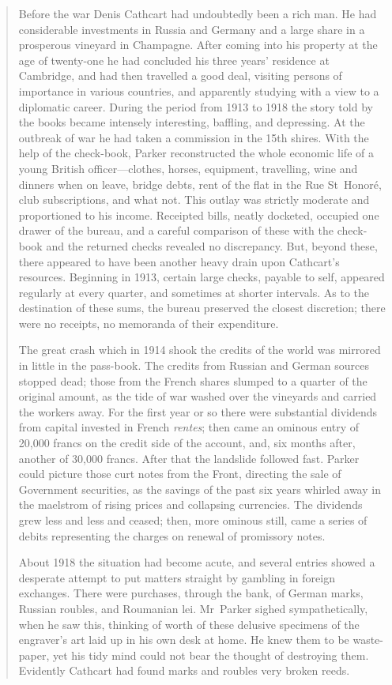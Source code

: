 \begin{quotation}
Before the war Denis Cathcart had undoubtedly been a rich man. He had considerable investments in Russia and Germany and a large share in a prosperous vineyard in Champagne. After coming into his property at the age of twenty-one he had concluded his three years' residence at Cambridge, and had then travelled a good deal, visiting persons of importance in various countries, and apparently studying with a view to a diplomatic career. During the period from 1913 to 1918 the story told by the books became intensely interesting, baffling, and depressing. At the outbreak of war he had taken a commission in the 15th \doubleemdash shires.  With the help of the check-book, Parker reconstructed the whole economic life of a young British officer—clothes, horses, equipment, travelling, wine and dinners when on leave, bridge debts, rent of the flat in the Rue St~Honoré, club subscriptions, and what not. This outlay was strictly moderate and proportioned to his income. Receipted bills, neatly docketed, occupied one drawer of the bureau, and a careful comparison of these with the check-book and the returned checks revealed no discrepancy. But, beyond these, there appeared to have been another heavy drain upon Cathcart's resources. Beginning in 1913, certain large checks, payable to self, appeared regularly at every quarter, and sometimes at shorter intervals. As to the destination of these sums, the bureau preserved the closest discretion; there were no receipts, no memoranda of their expenditure.

The great crash which in 1914 shook the credits of the world was mirrored in little in the pass-book. The credits from Russian and German sources stopped dead; those from the French shares slumped to a quarter of the original amount, as the tide of war washed over the vineyards and carried the workers away. For the first year or so there were substantial dividends from capital invested in French \textit{rentes}; then came an ominous entry of 20,000 francs on the credit side of the account, and, six months after, another of 30,000 francs. After that the landslide followed fast. Parker could picture those curt notes from the Front, directing the sale of Government securities, as the savings of the past six years whirled away in the maelstrom of rising prices and collapsing currencies. The dividends grew less and less and ceased; then, more ominous still, came a series of debits representing the charges on renewal of promissory notes.

About 1918 the situation had become acute, and several entries showed a desperate attempt to put matters straight by gambling in foreign exchanges. There were purchases, through the bank, of German marks, Russian roubles, and Roumanian lei. Mr~Parker sighed sympathetically, when he saw this, thinking of  worth of these delusive specimens of the engraver's art laid up in his own desk at home. He knew them to be waste-paper, yet his tidy mind could not bear the thought of destroying them. Evidently Cathcart had found marks and roubles very broken reeds.


\end{quotation}
